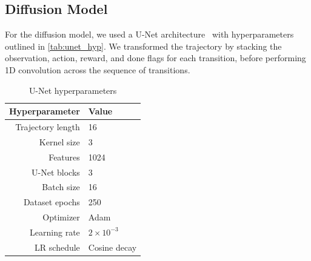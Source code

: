 \documentclass[10pt]{article} %
\theoremstyle{plain}
\theoremstyle{definition}
\theoremstyle{remark}
\begin{document}
\subsection{Diffusion Model}
For the diffusion model, we used a U-Net architecture~\citep{ronneberger2015u} with hyperparameters outlined in \autoref{tab:unet_hyp}.
We transformed the trajectory by stacking the observation, action, reward, and done flags for each transition, before performing 1D convolution across the sequence of transitions.

\begin{table}[h!]
    \centering
    \caption{U-Net hyperparameters}
    \begin{tabular}{@{}rl@{}}
        \toprule
        \textbf{Hyperparameter} & \textbf{Value} \\
        \midrule
        Trajectory length & 16 \\
        Kernel size & 3 \\
        Features & 1024 \\
        U-Net blocks & 3 \\
        \cmidrule{2-2}
        Batch size & 16 \\
        Dataset epochs & 250 \\
        \cmidrule{2-2}
        Optimizer & Adam \\
        Learning rate & $2 \times 10^{-3}$ \\
        LR schedule & Cosine decay \\
        \bottomrule
    \end{tabular}
    \label{tab:unet_hyp}
\end{table}
\end{document}
